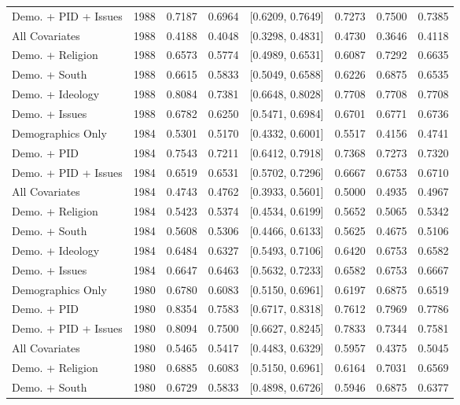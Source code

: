 \begin{longtable}{lrrrlrrr}
  Demo. + PID + Issues & 1988 & 0.7187 & 0.6964 & [0.6209, 0.7649] & 0.7273 & 0.7500 & 0.7385 \\ 
  All Covariates & 1988 & 0.4188 & 0.4048 & [0.3298, 0.4831] & 0.4730 & 0.3646 & 0.4118 \\ 
  Demo. + Religion & 1988 & 0.6573 & 0.5774 & [0.4989, 0.6531] & 0.6087 & 0.7292 & 0.6635 \\ 
  Demo. + South & 1988 & 0.6615 & 0.5833 & [0.5049, 0.6588] & 0.6226 & 0.6875 & 0.6535 \\ 
  Demo. + Ideology & 1988 & 0.8084 & 0.7381 & [0.6648, 0.8028] & 0.7708 & 0.7708 & 0.7708 \\ 
  Demo. + Issues & 1988 & 0.6782 & 0.6250 & [0.5471, 0.6984] & 0.6701 & 0.6771 & 0.6736 \\ 
  Demographics Only & 1984 & 0.5301 & 0.5170 & [0.4332, 0.6001] & 0.5517 & 0.4156 & 0.4741 \\ 
  Demo. + PID & 1984 & 0.7543 & 0.7211 & [0.6412, 0.7918] & 0.7368 & 0.7273 & 0.7320 \\ 
  Demo. + PID + Issues & 1984 & 0.6519 & 0.6531 & [0.5702, 0.7296] & 0.6667 & 0.6753 & 0.6710 \\ 
  All Covariates & 1984 & 0.4743 & 0.4762 & [0.3933, 0.5601] & 0.5000 & 0.4935 & 0.4967 \\ 
  Demo. + Religion & 1984 & 0.5423 & 0.5374 & [0.4534, 0.6199] & 0.5652 & 0.5065 & 0.5342 \\ 
  Demo. + South & 1984 & 0.5608 & 0.5306 & [0.4466, 0.6133] & 0.5625 & 0.4675 & 0.5106 \\ 
  Demo. + Ideology & 1984 & 0.6484 & 0.6327 & [0.5493, 0.7106] & 0.6420 & 0.6753 & 0.6582 \\ 
  Demo. + Issues & 1984 & 0.6647 & 0.6463 & [0.5632, 0.7233] & 0.6582 & 0.6753 & 0.6667 \\ 
  Demographics Only & 1980 & 0.6780 & 0.6083 & [0.5150, 0.6961] & 0.6197 & 0.6875 & 0.6519 \\ 
  Demo. + PID & 1980 & 0.8354 & 0.7583 & [0.6717, 0.8318] & 0.7612 & 0.7969 & 0.7786 \\ 
  Demo. + PID + Issues & 1980 & 0.8094 & 0.7500 & [0.6627, 0.8245] & 0.7833 & 0.7344 & 0.7581 \\ 
  All Covariates & 1980 & 0.5465 & 0.5417 & [0.4483, 0.6329] & 0.5957 & 0.4375 & 0.5045 \\ 
  Demo. + Religion & 1980 & 0.6885 & 0.6083 & [0.5150, 0.6961] & 0.6164 & 0.7031 & 0.6569 \\ 
  Demo. + South & 1980 & 0.6729 & 0.5833 & [0.4898, 0.6726] & 0.5946 & 0.6875 & 0.6377 \\ 

\end{longtable}
